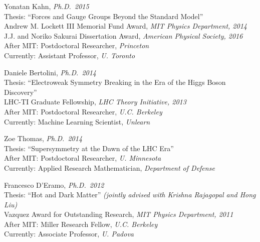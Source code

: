 \item Yonatan Kahn, \emph{Ph.D.~2015}
\\ Thesis: ``Forces and Gauge Groups Beyond the Standard Model''
\\ Andrew M. Lockett III Memorial Fund Award, \emph{MIT Physics Department, 2014}
\\ J.J. and Noriko Sakurai Dissertation Award, \emph{American Physical Society, 2016}
\\ After MIT: Postdoctoral Researcher, \emph{Princeton}
\\ Currently: Assistant Professor, \emph{U. Toronto}

\item Daniele Bertolini, \emph{Ph.D.~2014}
\\ Thesis: ``Electroweak Symmetry Breaking in the Era of the Higgs Boson Discovery''
\\ LHC-TI Graduate Fellowship, \emph{LHC Theory Initiative, 2013}
\\ After MIT: Postdoctoral Researcher, \emph{U.C. Berkeley}
\\ Currently: Machine Learning Scientist, \emph{Unlearn}

\item Zoe Thomas, \emph{Ph.D.~2014}
\\ Thesis: ``Supersymmetry at the Dawn of the LHC Era''
\\ After MIT: Postdoctoral Researcher, \emph{U. Minnesota}
\\ Currently: Applied Research Mathematician, \emph{Department of Defense}

\item Francesco D'Eramo, \emph{Ph.D.~2012}
\\ Thesis: ``Hot and Dark Matter'' \emph{(jointly advised with Krishna Rajagopal and Hong Liu)}
\\ Vazquez Award for Outstanding Research, \emph{MIT Physics Department, 2011}
\\ After MIT: Miller Research Fellow, \emph{U.C. Berkeley}
\\ Currently: Associate Professor, \emph{U. Padova}

\el
